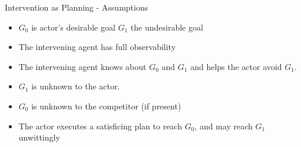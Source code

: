 \begin{frame}{Intervention as Planning - Assumptions}
\begin{itemize}
\item $G_0$ is actor's desirable goal $G_1$ the undesirable goal
\item The intervening agent has full observability
\item The intervening agent knows about $G_0$ and $G_1$ and helps the actor avoid $G_1$.
\item $G_1$ is unknown to the actor.
\item $G_0$ is unknown to the competitor (if present)
\item The actor executes a satisficing plan to reach $G_0$, and may reach $G_1$ unwittingly
\end{itemize}

\end{frame}